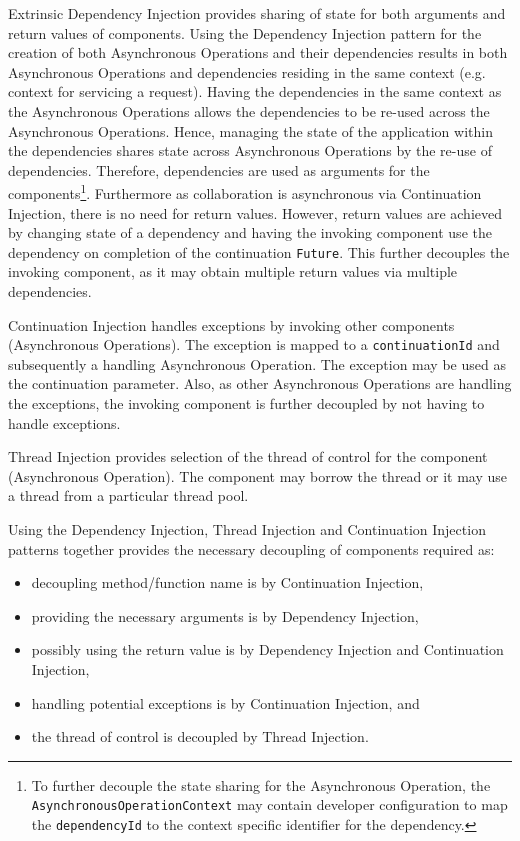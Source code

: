 \documentclass[prodmode]{style/acmlarge}
\begin{document}
Extrinsic Dependency Injection \cite{ioc} provides sharing of state for both
arguments and return values of components.  Using the Dependency Injection
pattern for the creation of both Asynchronous Operations and their dependencies
results in both Asynchronous Operations and dependencies residing in the same
context (e.g. context for servicing a request).  Having the dependencies in the
same context as the Asynchronous Operations allows the dependencies to be
re-used across the Asynchronous Operations.  Hence, managing the state of the
application within the dependencies shares state across Asynchronous Operations
by the re-use of dependencies.  Therefore, dependencies are used as arguments
for the components\footnote{To further decouple the state sharing for the
Asynchronous Operation, the \texttt{AsynchronousOperationContext} may contain
developer configuration to map the \texttt{dependencyId} to the context specific
identifier for the dependency.}.  Furthermore as collaboration is asynchronous
via Continuation Injection, there is no need for return values.  However, return
values are achieved by changing state of a dependency and having the invoking
component use the dependency on completion of the continuation \texttt{Future}. 
This further decouples the invoking component, as it may obtain multiple return
values via multiple dependencies.

Continuation Injection handles exceptions by invoking other components
(Asynchronous Operations). The exception is mapped to a \texttt{continuationId}
and subsequently a handling Asynchronous Operation.  The exception may be used
as the continuation parameter.  Also, as other Asynchronous Operations are
handling the exceptions, the invoking component is further decoupled by not
having to handle exceptions.

Thread Injection provides selection of the thread of control for the component
(Asynchronous Operation).  The component may borrow the thread or it may use a
thread from a particular thread pool.

Using the Dependency Injection, Thread Injection and Continuation Injection
patterns together provides the necessary decoupling of components required as:
\begin{itemize}
  \item decoupling method/function name is by Continuation Injection,
  \item providing the necessary arguments is by Dependency Injection,
  \item possibly using the return value is by Dependency Injection and Continuation Injection,
  \item handling potential exceptions is by Continuation Injection, and
  \item the thread of control is decoupled by Thread Injection.
\end{itemize}
\end{document}
